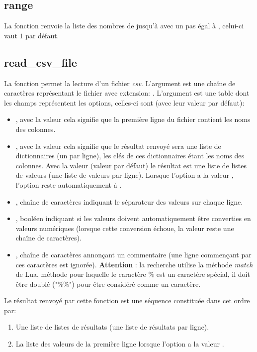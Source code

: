 \subsection{range}
La fonction  renvoie la liste des nombres de  jusqu'à  avec un pas égal à , celui-ci vaut $1$ par défaut.

\subsection{read\_csv\_file}
La fonction  permet la lecture d'un fichier \emph{csv}. L'argument  est une chaîne de caractères représentant le fichier avec extension: . L'argument  est une table dont les champs représentent les options, celles-ci sont (avec leur valeur par défaut):
\begin{itemize}
    \item {}, avec la valeur \true cela signifie que la première ligne du fichier contient les noms des colonnes.
    
    \item {}, avec la valeur \true cela signifie que le résultat renvoyé sera une liste de dictionnaires (un par ligne), les clés de ces dictionnaires étant les noms des colonnes. Avec la valeur \false (valeur par défaut) le résultat est une liste de listes de valeurs (une liste de valeurs par ligne). Lorsque l'option  a la valeur \false, l'option  reste automatiquement à \false.
    
    \item {}, chaîne de caractères indiquant le séparateur des valeurs sur chaque ligne.
    
    \item {}, booléen indiquant si les valeurs doivent automatiquement être converties en valeurs numériques (lorsque cette conversion échoue, la valeur reste une chaîne de caractères).
    
    \item {}, chaîne de caractères annonçant un commentaire (une ligne commençant par ces caractères est ignorée). \textbf{Attention} : la recherche utilise la méthode \emph{match} de Lua, méthode pour laquelle le caractère \% est un caractère spécial, il doit être doublé ("\%\%") pour être considéré comme un caractère.
\end{itemize}
Le résultat renvoyé par cette fonction est une séquence constituée dans cet ordre par:
    \begin{enumerate}
        \item Une liste de listes de résultats (une liste de résultats par ligne).
        \item La liste des valeurs de la première ligne lorsque l'option  a la valeur \true.
    \end{enumerate}


